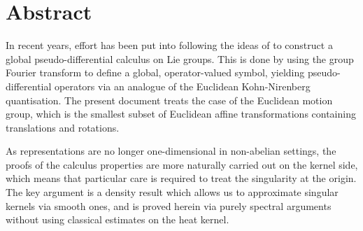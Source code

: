 \chapter*{Abstract}

In recent years,
effort has been put into following the ideas of \citeauthor{RuzhanskyTurunen10}
to construct a global pseudo-differential calculus on Lie groups.
This is done by using the group Fourier transform to define a global, operator-valued symbol,
yielding pseudo-differential operators via an analogue of the Euclidean Kohn-Nirenberg quantisation.
The present document treats the case of the Euclidean motion group,
which is the smallest subset of Euclidean affine transformations containing translations and rotations.

As representations are no longer one-dimensional in non-abelian settings,
the proofs of the calculus properties are more naturally carried out on the kernel side,
which means that particular care is required to treat the singularity at the origin.
The key argument is a density result which allows us to approximate singular kernels via smooth ones,
and is proved herein via purely spectral arguments without using classical estimates on the heat kernel.
